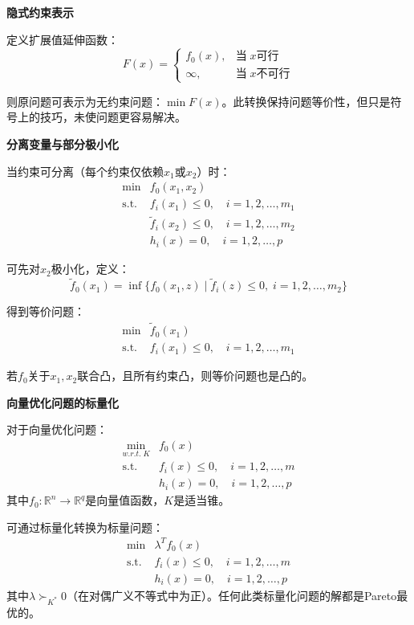 \documentclass[12pt,a4paper]{book}
\begin{document}
\textbf{隐式约束表示}

定义扩展值延伸函数：
\[
F(x) = \begin{cases}
f_0(x), & \text{当} \; x \text{可行} \\
\infty, & \text{当} \; x \text{不可行}
\end{cases}
\]

则原问题可表示为无约束问题：$\min F(x)$。此转换保持问题等价性，但只是符号上的技巧，未使问题更容易解决。

\textbf{分离变量与部分极小化}

当约束可分离（每个约束仅依赖$x_1$或$x_2$）时：
\begin{equation}
    \begin{aligned}
        \min & f_0(x_1,x_2) \\
        \text{s.t.} & f_i(x_1) \leq 0, \quad i = 1,2,\dots,m_1\\
        & \tilde{f}_i(x_2) \leq 0, \quad i = 1,2,\dots,m_2\\
        & h_i(x) = 0, \quad i = 1,2,\dots,p
    \end{aligned}
\end{equation}

可先对$x_2$极小化，定义：
\[
\tilde{f}_0(x_1) = \inf \{f_0(x_1,z) \mid \tilde{f}_i(z) \leq 0, \; i = 1,2,\dots,m_2 \}
\]

得到等价问题：
\begin{equation}
    \begin{aligned}
        \min & \tilde{f}_0(x_1) \\
        \text{s.t.} & f_i(x_1) \leq 0, \quad i = 1,2,\dots,m_1
    \end{aligned}
\end{equation}

若$f_0$关于$x_1,x_2$联合凸，且所有约束凸，则等价问题也是凸的。

\textbf{向量优化问题的标量化}

对于向量优化问题：
\begin{equation}
    \begin{aligned}
        \min_{w.r.t. \; K} & f_0(x) \\
        \text{s.t.} & f_i(x) \leq 0, \quad i = 1,2,\dots,m\\
        & h_i(x) = 0, \quad i = 1,2,\dots,p
    \end{aligned}
\end{equation}
其中$f_0: \mathbb{R}^n \to \mathbb{R}^q$是向量值函数，$K$是适当锥。

可通过标量化转换为标量问题：
\begin{equation}
    \begin{aligned}
        \min & \lambda^T f_0(x) \\
        \text{s.t.} & f_i(x) \leq 0, \quad i = 1,2,\dots,m\\
        & h_i(x) = 0, \quad i = 1,2,\dots,p
    \end{aligned}
\end{equation}
其中$\lambda \succ_{K^*} 0$（在对偶广义不等式中为正）。任何此类标量化问题的解都是Pareto最优的。
\end{document}
